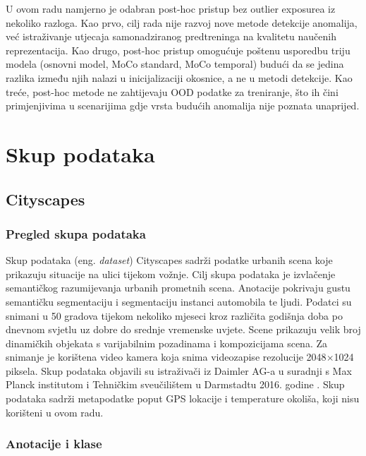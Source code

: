 \documentclass[diplomskirad]{fer}
\begin{document}
U ovom radu namjerno je odabran post-hoc pristup bez outlier exposurea iz nekoliko razloga. Kao prvo, cilj rada nije razvoj nove metode detekcije anomalija, već istraživanje utjecaja samonadziranog predtreninga na kvalitetu naučenih reprezentacija. Kao drugo, post-hoc pristup omogućuje poštenu usporedbu triju modela (osnovni model, MoCo standard, MoCo temporal) budući da se jedina razlika između njih nalazi u inicijalizaciji okosnice, a ne u metodi detekcije. Kao treće, post-hoc metode ne zahtijevaju OOD podatke za treniranje, što ih čini primjenjivima u scenarijima gdje vrsta budućih anomalija nije poznata unaprijed.




\chapter{Skup podataka}
\label{pog:skup_podataka}



\section{Cityscapes}
\label{sec:cityscapes}

\subsection{Pregled skupa podataka}

Skup podataka (eng. \textit{dataset}) Cityscapes sadrži podatke urbanih scena koje prikazuju situacije na ulici tijekom vožnje. Cilj skupa podataka je izvlačenje semantičkog razumijevanja urbanih prometnih scena. Anotacije pokrivaju gustu semantičku segmentaciju i segmentaciju instanci automobila te ljudi. Podatci su snimani u 50 gradova tijekom nekoliko mjeseci kroz različita godišnja doba po dnevnom svjetlu uz dobre do srednje vremenske uvjete. Scene prikazuju velik broj dinamičkih objekata s varijabilnim pozadinama i kompozicijama scena. Za snimanje je korištena video kamera koja snima videozapise rezolucije 2048$\times$1024 piksela. Skup podataka objavili su istraživači iz Daimler AG-a u suradnji s Max Planck institutom i Tehničkim sveučilištem u Darmstadtu 2016. godine \cite{cordts2016cityscapes}. Skup podataka sadrži metapodatke poput GPS lokacije i temperature okoliša, koji nisu korišteni u ovom radu.

\subsection{Anotacije i klase}
\end{document}
